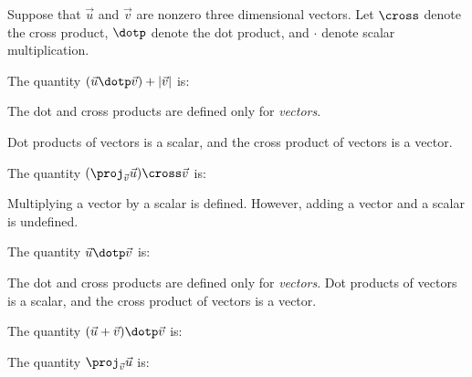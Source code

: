 \documentclass{ximera}
\author{Jim Talamo}
\begin{document}
\begin{exercise}
Suppose that $\vec u $ and $\vec v $ are nonzero three dimensional vectors.  Let $\cross$ denote the cross product, $\dotp$ denote the dot product, and $\cdot$ denote scalar multiplication.

The quantity $(\vec u \dotp \vec v)+ |\vec v|$ is:

\begin{multipleChoice}
\end{multipleChoice}


\begin{hint}
The dot and cross products are defined only for \emph{vectors}.
\end{hint}

\begin{hint}
Dot products of vectors is a scalar, and the cross product of vectors is a vector.
\end{hint}



The quantity $(\proj_{\vec v} \vec u)\cross \vec v$ is:

\begin{multipleChoice}
\end{multipleChoice}


\begin{hint}
Multiplying a vector by a scalar is defined. However, adding a vector and a scalar is undefined.
\end{hint}


The quantity $\vec u \dotp \vec v$ is:

\begin{multipleChoice}
\end{multipleChoice}

\begin{hint}
The dot and cross products are defined only for \emph{vectors}.  Dot products of vectors is a scalar, and the cross product of vectors is a vector.
\end{hint}


The quantity $(\vec u + \vec v) \dotp  \vec v$ is:
\begin{multipleChoice}
\end{multipleChoice}


The quantity $\proj_{\vec v} \vec u$ is:

\begin{multipleChoice}
\end{multipleChoice}





\end{exercise}
\end{document}
